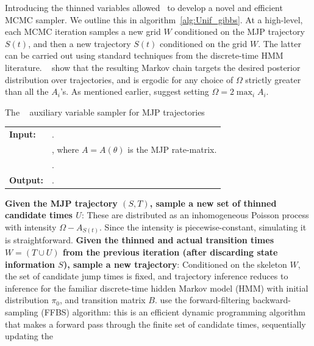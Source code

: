Introducing the thinned variables allowed~\cite{RaoTeh13} to develop
a novel and efficient MCMC sampler. We outline this in 
algorithm~\ref{alg:Unif_gibbs}. At a high-level, each MCMC iteration 
samples a new grid $W$ conditioned on the MJP trajectory $S(t)$, 
and then a new trajectory $S(t)$ conditioned on the grid $W$. The latter
can be carried out using standard techniques from the discrete-time
HMM literature.
    ~\cite{RaoTeh13} show that the resulting Markov chain targets
    the desired posterior distribution over trajectories, and is 
    ergodic for any choice of $\Omega$ strictly greater than all the
    $A_i$'s. As mentioned earlier, \cite{RaoTeh13} suggest setting $\Omega = 2\max_i A_i$.
\begin{algorithm}[H]
  \caption{The {\algname}~\cite{RaoTeh13} auxiliary variable sampler for MJP trajectories}
   \label{alg:Unif_gibbs}
  \begin{tabular}{l l}
   \textbf{Input:  } & \text{MJP parameters $\theta$, the initial distribution $\pi_0$, and the observations $X$}. \\
                     & \text{A  parameter $\Omega > \max_i A_i$}, where
   $A = A(\theta)$ is the MJP rate-matrix.\\
                      & \text{The previous MJP path $S(t) = (S, T)$}.\\ 
   \textbf{Output:  }& \text{A new MJP trajectory $\tilde{S} (t) = (\tilde{S}, \tilde{T})$}.\\
   \hline
   \end{tabular}
   \begin{algorithmic}[1]
\State \textbf{Given the MJP trajectory $(S,T)$, sample a new set of thinned 
candidate times $U$}: %
These are distributed as an inhomogeneous Poisson process with intensity 
$\Omega-A_{S(t)}$. Since the intensity is piecewise-constant, simulating it 
is straightforward.
\State \textbf{Given the thinned and actual transition times $W = (T \cup U)$
from the previous iteration (after discarding state information $S$), 
sample a new trajectory}:
    Conditioned on the skeleton $W$, the set of candidate jump
    times is fixed, and trajectory inference reduces to inference for
    the familiar discrete-time hidden Markov model (HMM) with initial distribution
    $\pi_0$, and transition matrix $B$. \cite{RaoTeh13} use the forward-filtering
    backward-sampling (FFBS) algorithm: this is an efficient dynamic 
    programming algorithm that makes a forward pass through the
    finite set of candidate times, sequentially updating the 

\end{algorithmic}
\end{algorithm}
